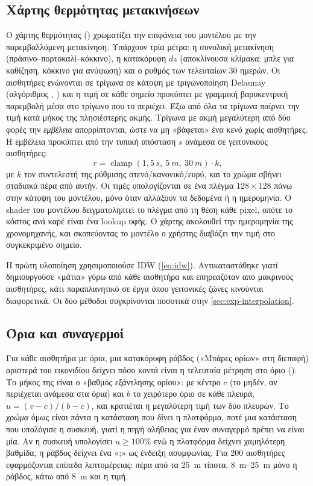 \subsection{Χάρτης θερμότητας μετακινήσεων}
Ο χάρτης θερμότητας () χρωματίζει την επιφάνεια του μοντέλου με την παρεμβαλλόμενη μετακίνηση. Υπάρχουν τρία μέτρα: η συνολική μετακίνηση (πράσινο--πορτοκαλί--κόκκινο), η κατακόρυφη $dz$ (αποκλίνουσα κλίμακα: μπλε για καθίζηση, κόκκινο για ανύψωση) και ο ρυθμός των τελευταίων 30 ημερών. Οι αισθητήρες ενώνονται σε τρίγωνα σε κάτοψη με τριγωνοποίηση Delaunay (αλγόριθμος , ) και η τιμή σε κάθε σημείο προκύπτει με γραμμική βαρυκεντρική παρεμβολή μέσα στο τρίγωνο που το περιέχει. Έξω από όλα τα τρίγωνα παίρνει την τιμή κατά μήκος της πλησιέστερης ακμής. Τρίγωνα με ακμή μεγαλύτερη από δύο φορές την \emph{εμβέλεια} απορρίπτονται, ώστε να μη «βάφεται» ένα κενό χωρίς αισθητήρες. Η εμβέλεια προκύπτει από την τυπική απόσταση $s$ ανάμεσα σε γειτονικούς αισθητήρες:
\begin{equation}
  r = \operatorname{clamp}(1{,}5\,s,\ \SI{5}{m},\ \SI{30}{m}) \cdot k,
\end{equation}
με $k$ τον συντελεστή της ρύθμισης στενό/κανονικό/ευρύ, και το χρώμα σβήνει σταδιακά πέρα από αυτήν. Οι τιμές υπολογίζονται σε ένα πλέγμα $128 \times 128$ πάνω στην κάτοψη του μοντέλου, μόνο όταν αλλάξουν τα δεδομένα ή η ημερομηνία. Ο shader του μοντέλου δειγματοληπτεί το πλέγμα από τη θέση κάθε pixel, οπότε το κόστος ανά καρέ είναι ένα lookup υφής. Ο χάρτης ακολουθεί την ημερομηνία της χρονομηχανής, και σκοπεύοντας το μοντέλο ο χρήστης διαβάζει την τιμή στο συγκεκριμένο σημείο.

Η πρώτη υλοποίηση χρησιμοποιούσε IDW (\cref{eq:idw}). Αντικαταστάθηκε γιατί δημιουργούσε «μάτια» γύρω από κάθε αισθητήρα και επηρεαζόταν από μακρινούς αισθητήρες, κάτι παραπλανητικό σε έργα όπου γειτονικές ζώνες κινούνται διαφορετικά. Οι δύο μέθοδοι συγκρίνονται ποσοτικά στην \cref{sec:exp-interpolation}.

\subsection{Όρια και συναγερμοί}
Για κάθε αισθητήρα με όρια, μια κατακόρυφη ράβδος («Μπάρες ορίων» στη διεπαφή) αριστερά του εικονιδίου δείχνει πόσο κοντά είναι η τελευταία μέτρηση στο όριο (). Το μήκος της είναι ο «βαθμός εξάντλησης ορίου»: με κέντρο $c$ (το μηδέν, αν περιέχεται ανάμεσα στα όρια) και $b$ το χειρότερο όριο σε κάθε πλευρά, $u = (v - c)/(b - c)$, και κρατιέται η μεγαλύτερη τιμή των δύο πλευρών. Το \emph{χρώμα} όμως είναι πάντα η κατάσταση που δίνει η πλατφόρμα, ποτέ μια κατάσταση που υπολόγισε η συσκευή, γιατί η πηγή αλήθειας για έναν συναγερμό πρέπει να είναι μία. Αν η συσκευή υπολογίσει $u \ge 100\%$ ενώ η πλατφόρμα δείχνει χαμηλότερη βαθμίδα, η ράβδος δείχνει ένα «;» ως ένδειξη ασυμφωνίας. Για 200 αισθητήρες εφαρμόζονται επίπεδα λεπτομέρειας: πέρα από τα \SI{25}{m} τίποτα, \SIrange{8}{25}{m} μόνο η ράβδος, κάτω από \SI{8}{m} και η τιμή.

